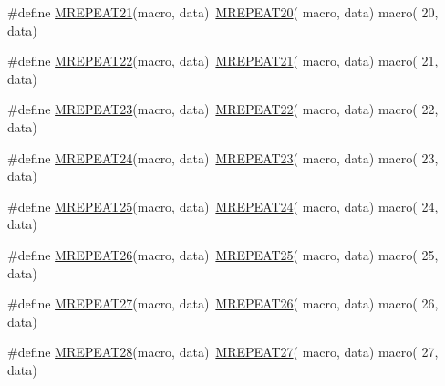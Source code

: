 \begin{DoxyCompactItemize}
\item 
\#define \mbox{\hyperlink{group__group__sam0__utils__mrepeat_ga7eaa38d60b2cfa155145e2d908577783}{M\+R\+E\+P\+E\+A\+T21}}(macro,  data)~\mbox{\hyperlink{group__group__sam0__utils__mrepeat_ga938b8f75b8eedaadcfec2c375f7c7d2a}{M\+R\+E\+P\+E\+A\+T20}}( macro, data)   macro( 20, data)
\item 
\#define \mbox{\hyperlink{group__group__sam0__utils__mrepeat_ga9ac17b91b98d21f0fdbfc1f4739fe0ed}{M\+R\+E\+P\+E\+A\+T22}}(macro,  data)~\mbox{\hyperlink{group__group__sam0__utils__mrepeat_ga7eaa38d60b2cfa155145e2d908577783}{M\+R\+E\+P\+E\+A\+T21}}( macro, data)   macro( 21, data)
\item 
\#define \mbox{\hyperlink{group__group__sam0__utils__mrepeat_gadd71c28e883bbbf5f033d518e35b230d}{M\+R\+E\+P\+E\+A\+T23}}(macro,  data)~\mbox{\hyperlink{group__group__sam0__utils__mrepeat_ga9ac17b91b98d21f0fdbfc1f4739fe0ed}{M\+R\+E\+P\+E\+A\+T22}}( macro, data)   macro( 22, data)
\item 
\#define \mbox{\hyperlink{group__group__sam0__utils__mrepeat_gaa40f282e37901ebbaac8b42af65e02fb}{M\+R\+E\+P\+E\+A\+T24}}(macro,  data)~\mbox{\hyperlink{group__group__sam0__utils__mrepeat_gadd71c28e883bbbf5f033d518e35b230d}{M\+R\+E\+P\+E\+A\+T23}}( macro, data)   macro( 23, data)
\item 
\#define \mbox{\hyperlink{group__group__sam0__utils__mrepeat_ga10a7a74d8723d1fd28cdc2b0509854d2}{M\+R\+E\+P\+E\+A\+T25}}(macro,  data)~\mbox{\hyperlink{group__group__sam0__utils__mrepeat_gaa40f282e37901ebbaac8b42af65e02fb}{M\+R\+E\+P\+E\+A\+T24}}( macro, data)   macro( 24, data)
\item 
\#define \mbox{\hyperlink{group__group__sam0__utils__mrepeat_ga83d8975851482186f25f70bd64384a12}{M\+R\+E\+P\+E\+A\+T26}}(macro,  data)~\mbox{\hyperlink{group__group__sam0__utils__mrepeat_ga10a7a74d8723d1fd28cdc2b0509854d2}{M\+R\+E\+P\+E\+A\+T25}}( macro, data)   macro( 25, data)
\item 
\#define \mbox{\hyperlink{group__group__sam0__utils__mrepeat_gad5d25e8243cfb609c41b148d18af27ac}{M\+R\+E\+P\+E\+A\+T27}}(macro,  data)~\mbox{\hyperlink{group__group__sam0__utils__mrepeat_ga83d8975851482186f25f70bd64384a12}{M\+R\+E\+P\+E\+A\+T26}}( macro, data)   macro( 26, data)
\item 
\#define \mbox{\hyperlink{group__group__sam0__utils__mrepeat_gab45193969a834715c8a19fc7c2d4a173}{M\+R\+E\+P\+E\+A\+T28}}(macro,  data)~\mbox{\hyperlink{group__group__sam0__utils__mrepeat_gad5d25e8243cfb609c41b148d18af27ac}{M\+R\+E\+P\+E\+A\+T27}}( macro, data)   macro( 27, data)

\end{DoxyCompactItemize}
